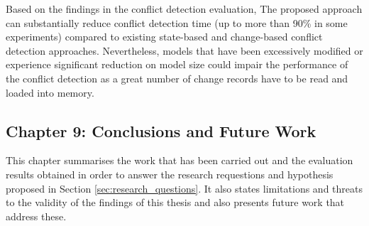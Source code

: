 Based on the findings in the conflict detection evaluation, The proposed approach can substantially reduce conflict detection time (up to more than 90\% in some experiments) compared to existing state-based and change-based conflict detection approaches. Nevertheless, models that have been excessively modified or experience significant reduction on model size could impair the performance of the conflict detection as a great number of change records have to be read and loaded into memory.

\subsection{Chapter 9: Conclusions and Future Work}
\label{sec:chapter_8_conclusions_and_future_work}
This chapter summarises the work that has been carried out and the evaluation results obtained in order to answer the research requestions and hypothesis proposed in Section \ref{sec:research_questions}. It also states limitations and threats to the validity of the findings of this thesis and also presents future work that address these.

